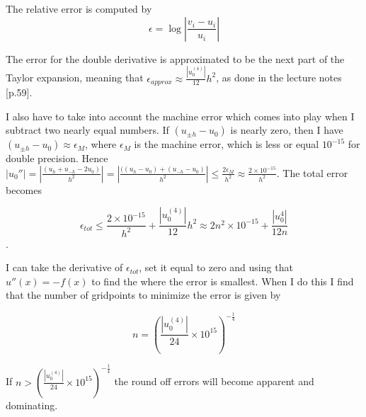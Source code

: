 \documentclass[12pt]{article}
\begin{document}
 The relative error is computed by 
 \begin{equation}\label{eq:rel_error}
  \epsilon=\log{\left|\frac{v_{i}-u_{i}}{u_{i}}\right|}
 \end{equation} 

 The error for the double derivative is approximated to be the next part of the Taylor expansion, meaning that $\epsilon_{approx}\approx \frac{|u_0^{(4)}|}{12}h^2 $, as done in the lecture notes \cite{morten}[p.59]. 

 I also have to take into account the machine error which comes into play when I subtract two nearly equal numbers. If $(u_{\pm h}-u_0)$ is nearly zero, then I have $(u_{\pm h}-u_0)\approx \epsilon_M$, where $\epsilon_M$ is the machine error, which is less or equal $10^{-15}$ for double precision. Hence $|u_0''|=\left|\frac{(u_h+u_{-h}-2u_0)}{h^2} \right|=\left|\frac{((u_h-u_0)+(u_{-h}-u_0)}{h^2} \right|\leq \frac{2\epsilon_M}{h^2}\approx \frac{2\times 10^{-15}}{h^2}$. The total error becomes 
 
 \begin{equation}
  \label{eq:total_error}
  \epsilon_{tot}\leq \frac{2\times 10^{-15}}{h^2}+\frac{|u_0^{(4)}|}{12}h^2\approx 2n^2\times 10^{-15}+\frac{|u_0^{4}|}{12n}
 \end{equation}. 

 I can take the derivative of $\epsilon_{tot}$, set it equal to zero and using that $u''(x)=-f(x)$ to find the where the error is smallest. When I do this I find that the number of gridpoints to minimize the error is given by
 
 \begin{equation}
   \label{eq:error_n}
  n=\left(\frac{|u_0^{(4)} |}{24}\times 10^{15}\right)^{-\frac{1}{4}}
\end{equation}

If $n>\left(\frac{|u_0^{(4)} |}{24}\times 10^{15}\right)^{-\frac{1}{4}}$ the round off errors will become apparent and dominating.
\end{document}
